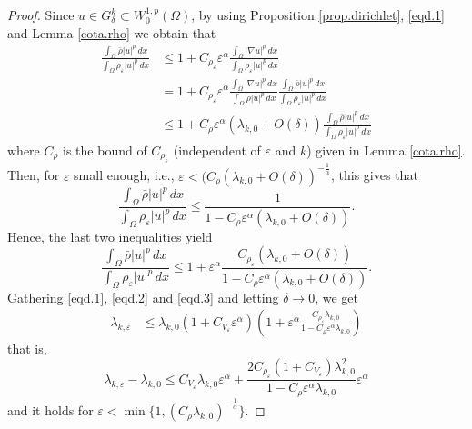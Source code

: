 \documentclass[10pt,a4paper]{amsart}
\begin{document}
\begin{proof}
Since $u\in G_\delta^k\subset W^{1,p}_0(\Omega)$, by using Proposition \ref{prop.dirichlet}, \eqref{eqd.1} and Lemma \ref{cota.rho} we obtain that
\begin{align*}
 \frac{\int_\Omega  \bar \rho |u|^p\,dx}{\int_\Omega  \rho_\varepsilon |u|^p\,dx} &\leq 1 + C_{\rho_\varepsilon} \varepsilon^\alpha  \frac{\int_\Omega |\nabla u|^p\,dx}{\int_\Omega \rho_\varepsilon |u|^p\,dx}\\
&= 1 + C_{\rho_\varepsilon} \varepsilon^\alpha   \frac{\int_\Omega |\nabla u|^p\,dx}{\int_\Omega \bar \rho |u|^p\,dx} \frac{\int_\Omega \bar \rho |u|^p\,dx}{\int_\Omega \rho_\varepsilon |u|^p\,dx}\\
&\leq 1 + C_\rho \varepsilon^\alpha (\lambda_{k,0}+O(\delta)) \frac{\int_\Omega \bar \rho |u|^p\,dx}{\int_\Omega \rho_\varepsilon |u|^p\,dx}
\end{align*}
where $C_\rho$ is the bound of $C_{\rho_\varepsilon}$ (independent of $\varepsilon$ and $k$) given in  Lemma \ref{cota.rho}. Then, for $\varepsilon$ small enough, i.e., $\varepsilon<(C_\rho ( \lambda_{k,0}+O(\delta))^{-\frac{1}{\alpha}}$, this gives that
$$
\frac{\int_\Omega  \bar \rho |u|^p\,dx}{\int_\Omega  \rho_\varepsilon |u|^p\,dx}\leq \frac{1}{1- C_\rho \varepsilon^\alpha  (\lambda_{k,0}+O(\delta))}.
$$
Hence, the last two inequalities yield
\begin{equation} \label{eqd.3}
\frac{\int_\Omega  \bar \rho |u|^p\,dx}{\int_\Omega  \rho_\varepsilon |u|^p\,dx}\leq 1+ \varepsilon^\alpha \frac{ C_{\rho_\varepsilon} (\lambda_{k,0}+O(\delta))}{1- C_\rho\varepsilon^\alpha  (\lambda_{k,0}+O(\delta)) }.
\end{equation}
Gathering \eqref{eqd.1}, \eqref{eqd.2} and \eqref{eqd.3} and letting $\delta\to 0$, we get
\begin{align*}
\lambda_{k,\varepsilon}&\leq \lambda_{k,0}(1 +C_{V_\varepsilon} \varepsilon^\alpha  ) \left( 1+ \varepsilon^\alpha\frac{ C_{\rho_\varepsilon}   \lambda_{k,0}}{1- C_\rho \varepsilon^\alpha   \lambda_{k,0} } \right)
\end{align*}
that is, 
\begin{equation} \label{eq.r.1}
\lambda_{k,\varepsilon}-\lambda_{k,0} \leq C_{V_\varepsilon} \lambda_{k,0} \varepsilon^\alpha +  \frac{2 C_{\rho_\varepsilon} (1+C_{V_\varepsilon}) \lambda_{k,0}^2}{1- C_\rho  \varepsilon^\alpha \lambda_{k,0}}\varepsilon^\alpha
\end{equation}
and it holds for $\varepsilon< \min\{1,( C_\rho\lambda_{k,0})^{-\frac{1}{\alpha}}\}$.



\end{proof}
\end{document}
